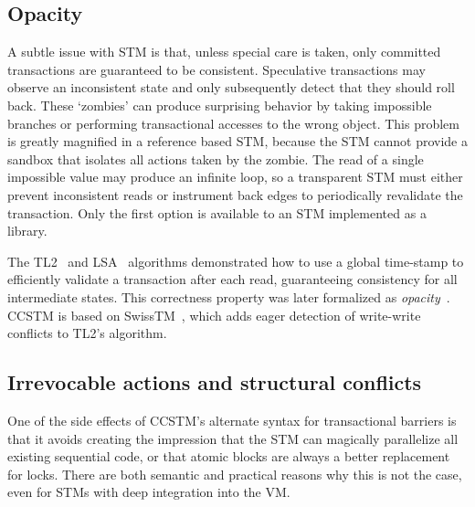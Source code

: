 \subsection{Opacity}

A subtle issue with STM is that, unless special care is taken, only
committed transactions are guaranteed to be consistent.  Speculative
transactions may observe an inconsistent state and only subsequently
detect that they should roll back.  These `zombies' can produce
surprising behavior by taking impossible branches or performing
transactional accesses to the wrong object.  This problem is greatly
magnified in a reference based STM, because the STM cannot provide a
sandbox that isolates all actions taken by the zombie.  The read of a
single impossible value may produce an infinite loop, so a transparent
STM must either prevent inconsistent reads or instrument back edges
to periodically revalidate the transaction.  Only the first option is
available to an STM implemented as a library.

The TL2~\cite{dice06tl2} and LSA~\cite{riegel06lsa} algorithms
demonstrated how to use a global time-stamp to efficiently validate
a transaction after each read, guaranteeing consistency for all
intermediate states.  This correctness property was later formalized
as \textit{opacity}~\cite{guerraoui08opacity}.  CCSTM is based on
SwissTM~\cite{dragojevic09swisstm}, which adds eager detection of
write-write conflicts to TL2's algorithm.

\subsection{Irrevocable actions and structural conflicts}

One of the side effects of CCSTM's alternate syntax for transactional barriers
is that it avoids creating the impression that the STM can magically
parallelize all existing sequential code, or that atomic blocks are
always a better replacement for locks.  There are both semantic and
practical reasons why this is not the case, even for STMs with deep
integration into the VM.

